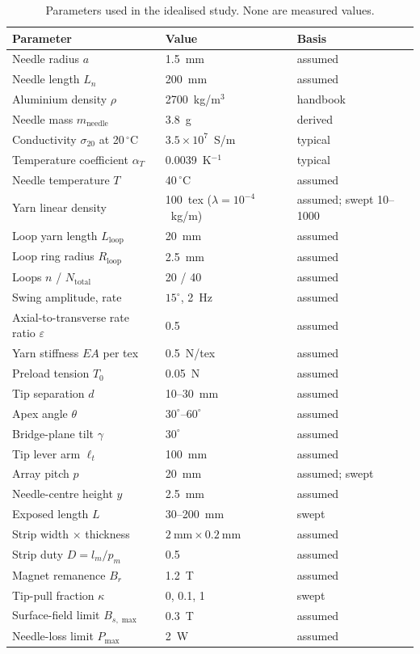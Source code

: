 \documentclass[12pt, a4paper]{article}
\begin{document}
\begin{table}[htbp]
\centering
\small
\begin{tabular}{l l l}
\toprule
Parameter & Value & Basis \\
\midrule
Needle radius $a$ & 1.5~mm & assumed \\
Needle length $L_n$ & 200~mm & assumed \\
Aluminium density $\rho$ & 2700~kg/m$^3$ & handbook \\
Needle mass $m_{\text{needle}}$ & 3.8~g & derived \\
Conductivity $\sigma_{20}$ at 20\,$^\circ$C & $3.5\times10^{7}$~S/m & typical \\
Temperature coefficient $\alpha_T$ & 0.0039~K$^{-1}$ & typical \\
Needle temperature $T$ & 40\,$^\circ$C & assumed \\
Yarn linear density & 100~tex ($\lambda=10^{-4}$~kg/m) & assumed; swept 10--1000 \\
Loop yarn length $L_{\text{loop}}$ & 20~mm & assumed \\
Loop ring radius $R_{\text{loop}}$ & 2.5~mm & assumed \\
Loops $n$ / $N_{\text{total}}$ & 20 / 40 & assumed \\
Swing amplitude, rate & $15^\circ$, 2~Hz & assumed \\
Axial-to-transverse rate ratio $\varepsilon$ & 0.5 & assumed \\
Yarn stiffness $EA$ per tex & 0.5~N/tex & assumed \\
Preload tension $T_0$ & 0.05~N & assumed \\
Tip separation $d$ & 10--30~mm & assumed \\
Apex angle $\theta$ & $30^\circ$--$60^\circ$ & assumed \\
Bridge-plane tilt $\gamma$ & $30^\circ$ & assumed \\
Tip lever arm $\ell_t$ & 100~mm & assumed \\
Array pitch $p$ & 20~mm & assumed; swept \\
Needle-centre height $y$ & 2.5~mm & assumed \\
Exposed length $L$ & 30--200~mm & swept \\
Strip width $\times$ thickness & $2~\text{mm}\times0.2~\text{mm}$ & assumed \\
Strip duty $D=l_m/p_m$ & 0.5 & assumed \\
Magnet remanence $B_r$ & 1.2~T & assumed \\
Tip-pull fraction $\kappa$ & 0, 0.1, 1 & swept \\
Surface-field limit $B_{s,\max}$ & 0.3~T & assumed \\
Needle-loss limit $P_{\max}$ & 2~W & assumed \\
\bottomrule
\end{tabular}
\caption{Parameters used in the idealised study. None are measured values.}
\label{tab:params}
\end{table}
\end{document}
